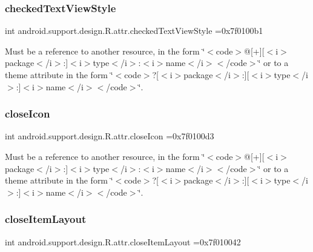 \subsubsection{\texorpdfstring{checked\+Text\+View\+Style}{checkedTextViewStyle}}
{\footnotesize\ttfamily int android.\+support.\+design.\+R.\+attr.\+checked\+Text\+View\+Style =0x7f0100b1\hspace{0.3cm}{\ttfamily [static]}}

Must be a reference to another resource, in the form \char`\"{}$<$code$>$@\mbox{[}+\mbox{]}\mbox{[}$<$i$>$package$<$/i$>$\+:\mbox{]}$<$i$>$type$<$/i$>$\+:$<$i$>$name$<$/i$>$$<$/code$>$\char`\"{} or to a theme attribute in the form \char`\"{}$<$code$>$?\mbox{[}$<$i$>$package$<$/i$>$\+:\mbox{]}\mbox{[}$<$i$>$type$<$/i$>$\+:\mbox{]}$<$i$>$name$<$/i$>$$<$/code$>$\char`\"{}. \mbox{\label{classandroid_1_1support_1_1design_1_1R_1_1attr_a5e570f928d1b026dd3dca79dcefa05cc}} 
\subsubsection{\texorpdfstring{close\+Icon}{closeIcon}}
{\footnotesize\ttfamily int android.\+support.\+design.\+R.\+attr.\+close\+Icon =0x7f0100d3\hspace{0.3cm}{\ttfamily [static]}}

Must be a reference to another resource, in the form \char`\"{}$<$code$>$@\mbox{[}+\mbox{]}\mbox{[}$<$i$>$package$<$/i$>$\+:\mbox{]}$<$i$>$type$<$/i$>$\+:$<$i$>$name$<$/i$>$$<$/code$>$\char`\"{} or to a theme attribute in the form \char`\"{}$<$code$>$?\mbox{[}$<$i$>$package$<$/i$>$\+:\mbox{]}\mbox{[}$<$i$>$type$<$/i$>$\+:\mbox{]}$<$i$>$name$<$/i$>$$<$/code$>$\char`\"{}. \mbox{\label{classandroid_1_1support_1_1design_1_1R_1_1attr_afdbc1658d4339331fec2a26f7f7c3ac6}} 
\subsubsection{\texorpdfstring{close\+Item\+Layout}{closeItemLayout}}
{\footnotesize\ttfamily int android.\+support.\+design.\+R.\+attr.\+close\+Item\+Layout =0x7f010042\hspace{0.3cm}{\ttfamily [static]}}

